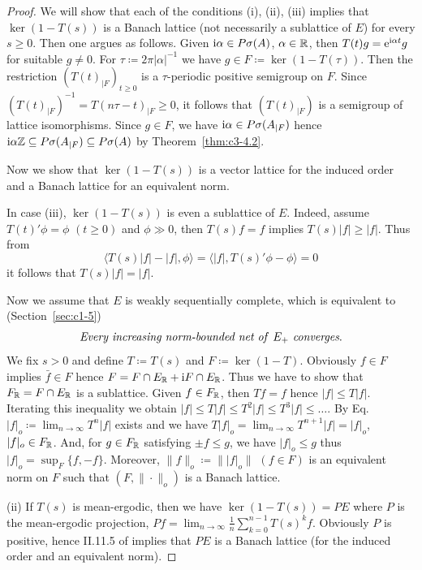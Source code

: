 \begin{proof}
	We will show that each of the conditions (i), (ii), (iii) implies that $\ker(1 - T(s))$ is a Banach lattice (not necessarily a sublattice of\/ $E$) for every $s \geq 0$. 
	Then one argues as follows. Given $\mathrm{i}\alpha \in P\sigma(A)$, $\alpha \in \mathbb{R} $, then $T(t)g = \mathrm{e}^{\mathrm{i}\alpha t}g$ for suitable $g \neq 0$. 
	For $\tau \coloneq  2\pi|\alpha|^{-1}$ we have $g \in F \coloneq  \ker (1 - T(\tau))$. 
	Then the restriction $(T(t)_{|F})_{t \geq 0}$ is a $\tau$-periodic positive semigroup on $F$. 
	Since $\left(T(t)_{|F}\right)^{-1} = T(n\tau-t)_{|F} \geq 0$, it follows that $(T(t)_{|F})$ is a semigroup of lattice isomorphisms. 
	Since $g \in F$, we have $\mathrm{i}\alpha \in P\sigma(A_{|F})$ hence $\mathrm{i}\alpha\mathbb{Z} \subseteq P\sigma(A_{|F}) \subseteq P\sigma(A)$ by Theorem~\ref{thm:c3-4.2}.
	
	Now we show that $\ker (1 - T(s))$ is a vector lattice for the induced order and a Banach lattice for an equivalent norm.
	
	In case (iii), $\ker (1 - T(s))$ is even a sublattice of\/ $E$. 
	Indeed, assume $T(t)'\phi = \phi$ $(t \geq 0)$ and $\phi \gg 0$, then $T(s)f = f$ implies $T(s)|f| \geq |f|$. 
	Thus from 
\[
	\langle T(s)|f| - |f|,\phi\rangle = \langle |f|,T(s)'\phi - \phi \rangle = 0
\]
%
it follows that $T(s)|f| = |f|$.
	
	Now we assume that $E$ is weakly sequentially complete, which is equivalent to (\cf Section~\ref{sec:c1-5})
\begin{equation}\label{eq:c3-4.5}
	\textit{Every increasing norm-bounded net of\/ $E_{+}$ converges}.
\end{equation}
	We fix $s > 0$ and define $T \coloneq  T(s)$ and $F \coloneq  \ker (1 - T)$. 
	Obviously $f \in F$ implies $\bar{f} \in F$ hence $F = F\cap E_{\mathbb{R} } + \mathrm{i} F\cap E_{\mathbb{R} }$. 
	Thus we have to show that $F_{\mathbb{R} } = F\cap E_{\mathbb{R} }$ is a sublattice. 
	Given $f \in F_{\mathbb{R} }$, then $Tf = f$ hence $|f| \leq T|f|$. 
	Iterating this inequality we obtain $|f| \leq T|f| \leq T^{2}|f| \leq T^{3}|f| \leq \ldots$.
	By Eq.~ $|f|_{o} \coloneq  \lim_{n\to \infty} T^{n}|f|$ exists and we have $T|f|_{o} = \lim_{n\to \infty} T^{n+1}|f| = |f|_{o}$, \ie $|f|_{o} \in F_{\mathbb{R} }$.
	And, for $g \in F_{\mathbb{R} }$ satisfying $\pm f \leq g$, we have $|f|_{o} \leq g$ thus $|f|_{o} = \sup_{F}\{f,-f\}$. 
	Moreover, $\|f\|_{o} \coloneq  \||f|_{o}\|$ $(f \in F)$ is an equivalent norm on $F$ such that $(F,\|\cdot\|_{o})$ is a Banach lattice.
	
	(ii) If\/ $T(s)$ is mean-ergodic, then we have $\ker (1 - T(s)) = PE$ where $P$ is the mean-ergodic projection, \ie $Pf = \lim_{n\to \infty}\frac{1}{n}\sum_{k=0}^{n-1}T(s)^{k}f$.
	Obviously $P$ is positive, hence II.11.5 of \textcite{schaefer:1974} implies that $PE$ is a Banach lattice (for the induced order and an equivalent norm).
\end{proof}
